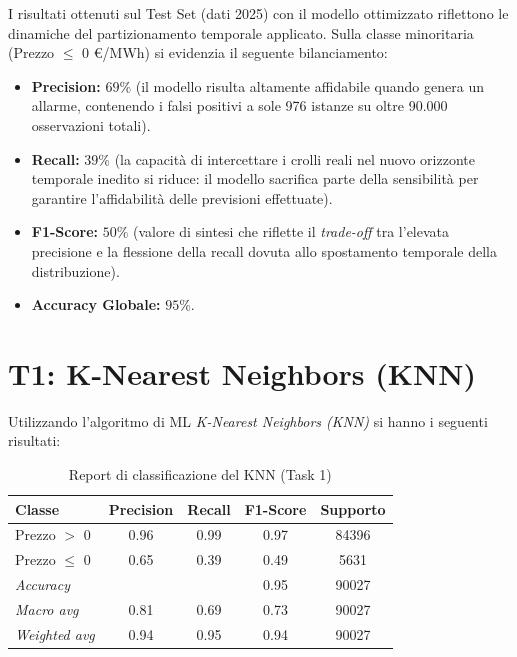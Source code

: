 I risultati ottenuti sul Test Set (dati 2025) con il modello ottimizzato riflettono le dinamiche del partizionamento temporale applicato. Sulla classe minoritaria (Prezzo $\leq$ 0 \euro/MWh) si evidenzia il seguente bilanciamento:
\begin{itemize}
    \item \textbf{Precision:} $69\%$ (il modello risulta altamente affidabile quando genera un allarme, contenendo i falsi positivi a sole 976 istanze su oltre 90.000 osservazioni totali).
    \item \textbf{Recall:} $39\%$ (la capacità di intercettare i crolli reali nel nuovo orizzonte temporale inedito si riduce: il modello sacrifica parte della sensibilità per garantire l'affidabilità delle previsioni effettuate).
    \item \textbf{F1-Score:} $50\%$ (valore di sintesi che riflette il \textit{trade-off} tra l'elevata precisione e la flessione della recall dovuta allo spostamento temporale della distribuzione).
    \item \textbf{Accuracy Globale:} $95\%$.
\end{itemize}

\section{T1: K-Nearest Neighbors (KNN)}

Utilizzando l'algoritmo di ML \textit{K-Nearest Neighbors (KNN)} si hanno i seguenti risultati:

\begin{table}[htbp]
    \centering
    \caption{Report di classificazione del KNN (Task 1)}
    \label{tab:report_knn_task1}
    \begin{tabular}{|l|c|c|c|c|}
        \hline
        \textbf{Classe} & \textbf{Precision} & \textbf{Recall} & \textbf{F1-Score} & \textbf{Supporto} \\ \hline
        Prezzo $>$ 0    & 0.96 & 0.99 & 0.97 & 84396 \\ \hline
        Prezzo $\leq$ 0 & 0.65 & 0.39 & 0.49 & 5631 \\ \hline
        \textit{Accuracy}     &      &      & 0.95 & 90027 \\ \hline
        \textit{Macro avg}    & 0.81 & 0.69 & 0.73 & 90027 \\ \hline
        \textit{Weighted avg} & 0.94 & 0.95 & 0.94 & 90027 \\ \hline
    \end{tabular}
\end{table}

